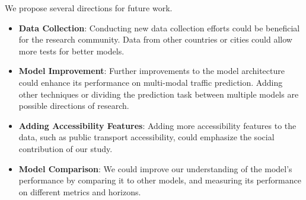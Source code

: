 We propose several directions for future work.
\begin{itemize}
    \item \textbf{Data Collection}:
    Conducting new data collection efforts could be beneficial for the research community.
    Data from other countries or cities could allow more tests for better models.
    \item \textbf{Model Improvement}:
    Further improvements to the model architecture could enhance its performance on multi-modal traffic prediction.
    Adding other techniques or dividing the prediction task between multiple models are possible directions of research.
    \item \textbf{Adding Accessibility Features}:
    Adding more accessibility features to the data, such as public transport accessibility, could emphasize the social contribution of our study.
    \item \textbf{Model Comparison}:
    We could improve our understanding of the model's performance by comparing it to other models, and measuring its performance on different metrics and horizons.
\end{itemize}
\vspace{1em}
